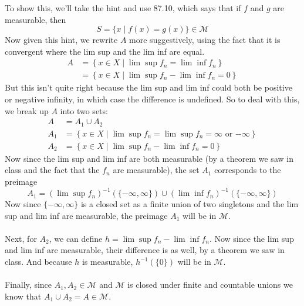 \documentclass[12pt]{article}
\theoremstyle{plain}
\theoremstyle{definition}
\theoremstyle{remark}
\begin{document}
\begin{enumerate}
To show this, we'll take the hint and use 87.10, which says that if $f$ and $g$ are measurable, then 
\[
    S = \{ x \; | \; f(x) = g(x) \} \in \mathscr{M}
\]
Now given this hint, we rewrite $A$ more suggestively, using the fact that it is convergent where the lim sup and the lim inf are equal. 
\begin{align*}
    A &= \left\{ x\in X \; | \; \lim \sup f_n = \lim \inf f_n 
     \right\} \\
    &= \left\{ x\in X \; | \; \lim \sup f_n - \lim \inf f_n = 0
     \right\} 
\end{align*}
But this isn't quite right because the lim sup and lim inf could both be positive or negative infinity, in which case the difference is undefined. So to deal with this, we break up $A$ into two sets:
\begin{align*}
    A &= A_1 \cup A_2 \\
    A_1 &= \left\{ x\in X \; | \; 
        \text{$\lim \sup f_n = \lim\sup f_n = \infty$ or 
        $-\infty$} \right\} \\
    A_2 &= \left\{ x\in X \; | \; \lim \sup f_n - \lim \inf f_n = 0
     \right\} 
\end{align*}
Now since the lim sup and lim inf are both measurable (by a theorem we saw in class and the fact that the $f_n$ are measurable), the set $A_1$ corresponds to the preimage 
\[
    A_1 = \left(\lim \sup f_n\right)^{-1}(\{-\infty, \infty\}) 
    \cup \left(\lim\inf f_n\right)^{-1}(\{-\infty, \infty\})
\]
Now since $\{-\infty,\infty\}$ is a closed set as a finite union of two singletons and the lim sup and lim inf are measurable, the preimage $A_1$ will be in $\mathscr{M}$.
\\
\\
Next, for $A_2$, we can define $h = \lim \sup f_n - \lim \inf f_n$. Now since the lim sup and lim inf are measurable, their difference is as well, by a theorem we saw in class. And because $h$ is measurable, $h^{-1}(\{0\})$ will be in $\mathscr{M}$.
\\
\\
Finally, since $A_1, A_2 \in \mathscr{M}$ and $\mathscr{M}$ is closed under finite and countable unions we know that $A_1 \cup A_2 = A\in\mathscr{M}$.



\end{enumerate}
\end{document}
